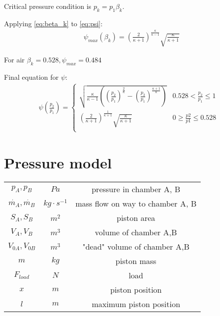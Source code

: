 Critical pressure condition is $p_k = p_1 \beta_k$.

Applying \ref{eq:beta_k} to \ref{eq:psi}:
\begin{align}
    &\psi_{max} (\beta_k) = 
    \left(\frac{2}{\kappa+1}\right)^\frac{\kappa}{\kappa-1}\sqrt{\frac{\kappa}{\kappa+1}}
\end{align}

For air $\beta_k = 0.528, \psi_{max} = 0.484$


Final equation for $\psi$:
\begin{align}
    \psi\left(\frac{p_2}{p_1}\right) = 
    \begin{cases}
    \sqrt{\frac{\kappa}{\kappa-1}\left(\left(\frac{p_2}{p_1}\right)^\frac{2}{\kappa} -
    \left(\frac{p_2}{p_1}\right)^\frac{\kappa + 1}{\kappa}\right)} & 0.528
    <\frac{p_2}{p_1} \le 1 \\
    \left(\frac{2}{\kappa +1}\right)^{\frac{1}{\kappa+1}}
    \sqrt{\frac{\kappa}{\kappa +1}} & 0 \ge \frac{p2}{p1} \le 0.528\\
    \end{cases}
\end{align}


\section{Pressure model}

\begin{tabular}{ |c|c|c| }
    \hline
    $p_A, p_B$              & $Pa$              & pressure in chamber A, B \\
    $\dot{m_A}, \dot{m_B}$  & $kg \cdot s^{-1}$ & mass flow on way to chamber A, B \\
    $S_A, S_B$              & $m^2$             & piston area  \\
    $V_A, V_B$              & $m^3$             & volume of chamber A,B \\
    $V_{0A}, V_{0B}$        & $m^3$             & "dead" volume of chamber A,B \\
    $m$                     & $kg$              & piston mass\\
    $F_{load}$              & $N$               & load \\
    $x$                     & $m$               & piston position \\
    $l$                     & $m$               & maximum piston position \\
    \hline
\end{tabular}

